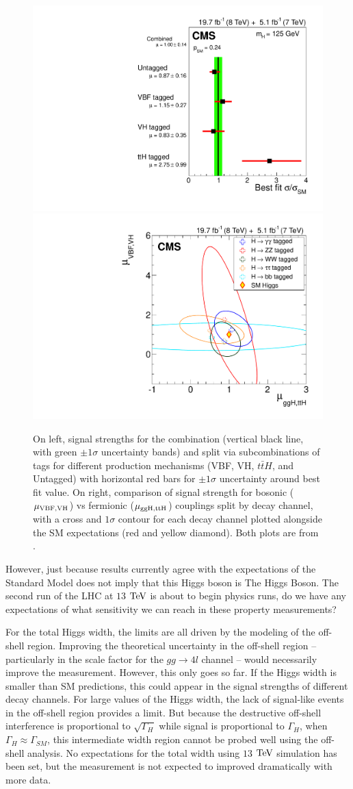 \begin{figure}[htbp]
\begin{center}
\includegraphics[width=.45\linewidth]{Conclusions/figures/sqr_mlz_ccc_mH125_prod.pdf}
\includegraphics[width=.45\linewidth]{Conclusions/figures/sqr_rvrf_scan_2d_all_68.pdf}
\caption[Higgs Boson Signal Strength for CMS Combination Split by Production]{On left, signal strengths for the combination (vertical black line, with green $\pm1\sigma$ uncertainty bands) and split via subcombinations of tags for different production mechanisms (VBF, VH, $t\bar{t}H$, and Untagged) with horizontal red bars for $\pm1\sigma$ uncertainty around best fit value. On right, comparison of signal strength for bosonic ($\mu_{\rm VBF,VH}$) vs fermionic ($\mu_{\rm ggH,ttH}$) couplings split by decay channel, with a cross and $1\sigma$ contour for each decay channel plotted alongside the SM expectations (red and yellow diamond). Both plots are from \cite{Khachatryan:2014jba}.}
\label{fig:CombHiggsProd}
\end{center}
\end{figure}

However, just because results currently agree with the expectations of the Standard Model does not imply that this Higgs boson is The Higgs Boson. The second run of the LHC at $13$ $\rm{TeV}$ is about to begin physics runs, do we have any expectations of what sensitivity we can reach in these property measurements?

For the total Higgs width, the limits are all driven by the modeling of the off-shell region. Improving the theoretical uncertainty in the off-shell region -- particularly in the scale factor for the $gg\rightarrow 4l$ channel -- would necessarily improve the measurement. However, this only goes so far. If the Higgs width is smaller than SM predictions, this could appear in the signal strengths of different decay channels. For large values of the Higgs width, the lack of signal-like events in the off-shell region provides a limit. But because the destructive off-shell interference is proportional to $\sqrt{\Gamma_{H}}$ while signal is proportional to $\Gamma_{H}$, when $\Gamma_{H}\approx\Gamma_{SM}$, this intermediate width region cannot be probed well using the off-shell analysis. No expectations for the total width using $13$ $\rm{TeV}$ simulation has been set, but the measurement is not expected to improved dramatically with more data.

